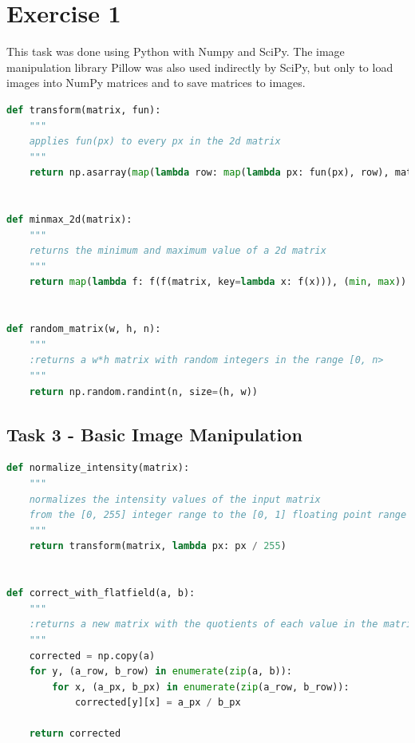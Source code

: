 \chapter{Exercise 1}

This task was done using Python with Numpy and SciPy.
The image manipulation library Pillow was also used indirectly by SciPy,
but only to load images into NumPy matrices and to save matrices to images.

\begin{lstlisting}[language=Python, caption=Utility functions]
def transform(matrix, fun):
    """
    applies fun(px) to every px in the 2d matrix
    """
    return np.asarray(map(lambda row: map(lambda px: fun(px), row), matrix))


def minmax_2d(matrix):
    """
    returns the minimum and maximum value of a 2d matrix
    """
    return map(lambda f: f(f(matrix, key=lambda x: f(x))), (min, max))


def random_matrix(w, h, n):
    """
    :returns a w*h matrix with random integers in the range [0, n>
    """
    return np.random.randint(n, size=(h, w))
\end{lstlisting}



\clearpage
\section*{Task 3 - Basic Image Manipulation}

\begin{lstlisting}[language=Python, label=flatfield, caption=Flatfield image correction]
def normalize_intensity(matrix):
    """
    normalizes the intensity values of the input matrix
    from the [0, 255] integer range to the [0, 1] floating point range
    """
    return transform(matrix, lambda px: px / 255)


def correct_with_flatfield(a, b):
    """
    :returns a new matrix with the quotients of each value in the matrices a and b
    """
    corrected = np.copy(a)
    for y, (a_row, b_row) in enumerate(zip(a, b)):
        for x, (a_px, b_px) in enumerate(zip(a_row, b_row)):
            corrected[y][x] = a_px / b_px

    return corrected
\end{lstlisting}

